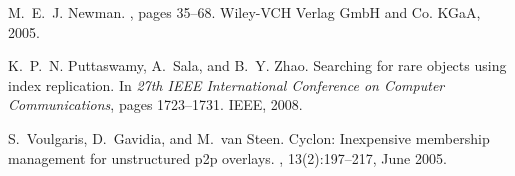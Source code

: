 \documentclass{sig-alternate}
\begin{document}
\begin{thebibliography}{10}
M.~E.~J. Newman.
, pages 35--68.
\newblock Wiley-VCH Verlag GmbH and Co. KGaA, 2005.

K.~P.~N. Puttaswamy, A.~Sala, and B.~Y. Zhao.
\newblock Searching for rare objects using index replication.
\newblock In {\em 27th IEEE International Conference on Computer
  Communications}, pages 1723--1731. IEEE, 2008.

S.~Voulgaris, D.~Gavidia, and M.~{van Steen}.
\newblock Cyclon: Inexpensive membership management for unstructured p2p
  overlays.
, 13(2):197--217, June
  2005.

\end{thebibliography}
\end{document}
